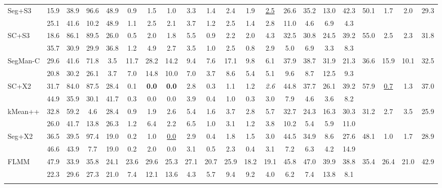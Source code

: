 \documentclass[preprint,12pt]{elsarticle}
\begin{document}
\begin{table}[!htb]
\begin{tabular}{lcccccccccccccccccccc}
Seg+S3 & 15.9 & 38.9 & 96.6 & 48.9 & 0.9 & 1.5 & 1.0 & 3.3 & 1.4 & 2.4 & 1.9 & \uline{2.5} & 26.6 & 35.2 & 13.0 & 42.3 & 50.1 & 1.7 & 2.0 & 29.3 \\
  & 25.1 & 41.6 & 10.2 & 48.9 & 1.1 & 2.5 & 2.1 & 3.7 & 1.2 & 2.5 & 1.4 & 2.8 & 11.0 & 4.6 & 6.9 & 4.3 &  &  &  &  \\ \addlinespace[2pt]
SC+S3 & 18.6 & 86.1 & 89.5 & 26.0 & 0.5 & 2.0 & 1.8 & 5.5 & 0.9 & 2.2 & 2.0 & 4.3 & 32.5 & 30.8 & 24.5 & 39.2 & 55.0 & 2.5 & 2.3 & 31.8 \\
  & 35.7 & 30.9 & 29.9 & 36.8 & 1.2 & 4.9 & 2.7 & 3.5 & 1.0 & 2.5 & 0.8 & 2.9 & 5.0 & 6.9 & 3.3 & 8.3 &  &  &  &  \\ \addlinespace[2pt]
\rowcolor{gray!12}
SegMan-C & 29.6 & 41.6 & 71.8 & 3.5 & 11.7 & 28.2 & 14.2 & 9.4 & 7.6 & 17.1 & 9.8 & 6.1 & 37.9 & 38.7 & 31.9 & 21.3 & 36.6 & 15.9 & 10.1 & 32.5 \\
  & 20.8 & 30.2 & 26.1 & 3.7 & 7.0 & 14.8 & 10.0 & 7.0 & 3.7 & 8.6 & 5.4 & 5.1 & 9.6 & 8.7 & 12.5 & 9.3 &  &  &  &  \\ \addlinespace[2pt]
SC+X2 & 31.7 & 84.0 & 87.5 & 28.4 & 0.1 & \textbf{0.0} & \textbf{0.0} & 2.8 & 0.3 & 1.1 & 1.2 & \textit{2.6} & 44.8 & 37.7 & 26.1 & 39.2 & 57.9 & \uline{0.7} & 1.3 & 37.0 \\
  & 44.9 & 35.9 & 30.1 & 41.7 & 0.3 & 0.0 & 0.0 & 3.9 & 0.4 & 1.0 & 0.3 & 3.0 & 7.9 & 4.6 & 3.6 & 8.2 &  &  &  &  \\ \addlinespace[2pt]
\rowcolor{gray!12}
kMean++ & 32.8 & 59.2 & 4.6 & 28.4 & 0.9 & 1.9 & 2.6 & 5.4 & 1.6 & 3.7 & 2.8 & 5.7 & 32.7 & 24.3 & 16.3 & 30.3 & 31.2 & 2.7 & 3.5 & 25.9 \\
  & 26.0 & 41.7 & 13.8 & 26.3 & 1.2 & 6.4 & 2.2 & 6.5 & 1.0 & 3.1 & 1.2 & 3.8 & 10.2 & 5.4 & 5.9 & 11.0 &  &  &  &  \\ \addlinespace[2pt]
Seg+X2 & 36.5 & 39.5 & 97.4 & 19.0 & 0.2 & 1.0 & \uline{0.0} & 2.9 & 0.4 & 1.8 & 1.5 & 3.0 & 44.5 & 34.9 & 8.6 & 27.6 & 48.1 & 1.0 & 1.7 & 28.9 \\
  & 46.6 & 43.9 & 7.7 & 19.0 & 0.2 & 2.0 & 0.0 & 3.1 & 0.5 & 2.3 & 0.4 & 3.1 & 7.2 & 6.3 & 4.2 & 14.9 &  &  &  &  \\ \addlinespace[2pt]
\rowcolor{gray!12}
FLMM & 47.9 & 33.9 & 35.8 & 24.1 & 23.6 & 29.6 & 25.3 & 27.1 & 20.7 & 25.9 & 18.2 & 19.1 & 45.8 & 47.0 & 39.9 & 38.8 & 35.4 & 26.4 & 21.0 & 42.9 \\
  & 22.3 & 29.6 & 27.3 & 21.0 & 7.4 & 12.1 & 13.6 & 4.3 & 5.7 & 9.4 & 9.2 & 4.0 & 6.2 & 7.4 & 13.8 & 8.1 &  &  &  &  \\ \addlinespace[2pt]

\end{tabular}
\end{table}
\end{document}
